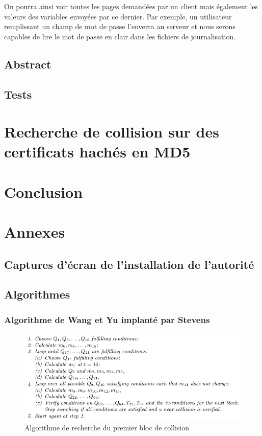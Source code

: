 \documentclass[a4paper,11pt,french]{report}
\begin{document}
On pourra ainsi voir toutes les pages demandées par un client mais également les valeurs des variables envoyées par ce dernier. Par exemple, un utilisateur remplissant un champ de mot de passe l'enverra au serveur et nous serons capables de lire le mot de passe en clair dans les fichiers de journalisation.
\section{Abstract}


\section{Tests}

\chapter{Recherche de collision sur des certificats hachés en MD5}


\chapter{Conclusion}


\chapter{Annexes}
\section{Captures d'écran de l'installation de l'autorité}

\section{Algorithmes}
\subsection{Algorithme de Wang et Yu implanté par Stevens}
\begin{figure}[h!]
  \includegraphics[scale=.61]{./images/fblock.png}
  \caption{Algorithme de recherche du premier bloc de collision}
\end{figure}
\end{document}
